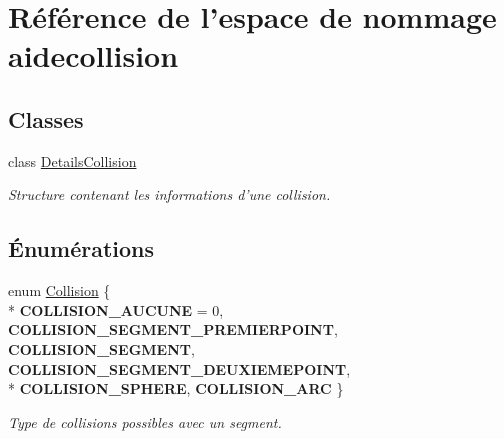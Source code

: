 \hypertarget{namespaceaidecollision}{\section{Référence de l'espace de nommage aidecollision}
\label{namespaceaidecollision}
}
\subsection*{Classes}
\begin{DoxyCompactItemize}
\item 
class \hyperlink{classaidecollision_1_1_details_collision}{Details\-Collision}
\begin{DoxyCompactList}\small\item\em Structure contenant les informations d'une collision. \end{DoxyCompactList}\end{DoxyCompactItemize}
\subsection*{Énumérations}
\begin{DoxyCompactItemize}
\item 
enum \hyperlink{namespaceaidecollision_a1c8613e2393aa3268262f9d23d60c0c9}{Collision} \{ \\*
{\bfseries C\-O\-L\-L\-I\-S\-I\-O\-N\-\_\-\-A\-U\-C\-U\-N\-E} = 0, 
{\bfseries C\-O\-L\-L\-I\-S\-I\-O\-N\-\_\-\-S\-E\-G\-M\-E\-N\-T\-\_\-\-P\-R\-E\-M\-I\-E\-R\-P\-O\-I\-N\-T}, 
{\bfseries C\-O\-L\-L\-I\-S\-I\-O\-N\-\_\-\-S\-E\-G\-M\-E\-N\-T}, 
{\bfseries C\-O\-L\-L\-I\-S\-I\-O\-N\-\_\-\-S\-E\-G\-M\-E\-N\-T\-\_\-\-D\-E\-U\-X\-I\-E\-M\-E\-P\-O\-I\-N\-T}, 
\\*
{\bfseries C\-O\-L\-L\-I\-S\-I\-O\-N\-\_\-\-S\-P\-H\-E\-R\-E}, 
{\bfseries C\-O\-L\-L\-I\-S\-I\-O\-N\-\_\-\-A\-R\-C}
 \}
\begin{DoxyCompactList}\small\item\em Type de collisions possibles avec un segment. \end{DoxyCompactList}\end{DoxyCompactItemize}
